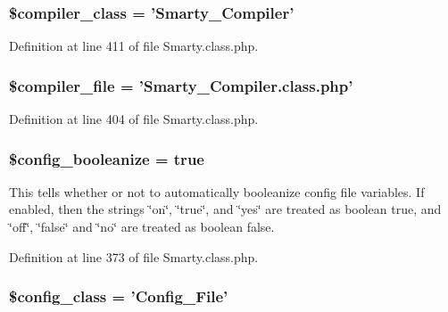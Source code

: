 \hypertarget{class_smarty_a7696818dcf593c5f9471d7f76ea2e645}{
\subsubsection[{\$compiler\-\_\-class}]{\setlength{\rightskip}{0pt plus 5cm}\$compiler\-\_\-class = '{\bf \-Smarty\-\_\-\-Compiler}'}}\label{class_smarty_a7696818dcf593c5f9471d7f76ea2e645}


\-Definition at line 411 of file \-Smarty.\-class.\-php.

\hypertarget{class_smarty_a5912fff45f8fdf37cf48552ee9444323}{
\subsubsection[{\$compiler\-\_\-file}]{\setlength{\rightskip}{0pt plus 5cm}\$compiler\-\_\-file = '\-Smarty\-\_\-\-Compiler.\-class.\-php'}}\label{class_smarty_a5912fff45f8fdf37cf48552ee9444323}


\-Definition at line 404 of file \-Smarty.\-class.\-php.

\hypertarget{class_smarty_ab3e274a6c3fd439b83380c17a71255bb}{
\subsubsection[{\$config\-\_\-booleanize}]{\setlength{\rightskip}{0pt plus 5cm}\$config\-\_\-booleanize = true}}\label{class_smarty_ab3e274a6c3fd439b83380c17a71255bb}
\-This tells whether or not to automatically booleanize config file variables. \-If enabled, then the strings \char`\"{}on\char`\"{}, \char`\"{}true\char`\"{}, and \char`\"{}yes\char`\"{} are treated as boolean true, and \char`\"{}off\char`\"{}, \char`\"{}false\char`\"{} and \char`\"{}no\char`\"{} are treated as boolean false. 

\-Definition at line 373 of file \-Smarty.\-class.\-php.

\hypertarget{class_smarty_a1ecdac7cb85b1aea3de21235de5db8d9}{
\subsubsection[{\$config\-\_\-class}]{\setlength{\rightskip}{0pt plus 5cm}\$config\-\_\-class = '{\bf \-Config\-\_\-\-File}'}}\label{class_smarty_a1ecdac7cb85b1aea3de21235de5db8d9}


